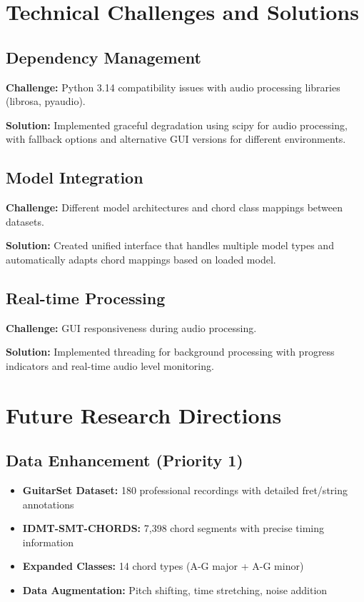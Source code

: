 \documentclass[11pt]{article}
\begin{document}
\section*{Technical Challenges and Solutions}

\subsection*{Dependency Management}
\textbf{Challenge:} Python 3.14 compatibility issues with audio processing libraries (librosa, pyaudio).

\textbf{Solution:} Implemented graceful degradation using scipy for audio processing, with fallback options and alternative GUI versions for different environments.

\subsection*{Model Integration}
\textbf{Challenge:} Different model architectures and chord class mappings between datasets.

\textbf{Solution:} Created unified interface that handles multiple model types and automatically adapts chord mappings based on loaded model.

\subsection*{Real-time Processing}
\textbf{Challenge:} GUI responsiveness during audio processing.

\textbf{Solution:} Implemented threading for background processing with progress indicators and real-time audio level monitoring.

\section*{Future Research Directions}

\subsection*{Data Enhancement (Priority 1)}
\begin{itemize}[leftmargin=*,itemsep=2pt]
  \item \textbf{GuitarSet Dataset:} 180 professional recordings with detailed fret/string annotations
  \item \textbf{IDMT-SMT-CHORDS:} 7,398 chord segments with precise timing information
  \item \textbf{Expanded Classes:} 14 chord types (A-G major + A-G minor)
  \item \textbf{Data Augmentation:} Pitch shifting, time stretching, noise addition
\end{itemize}
\end{document}
